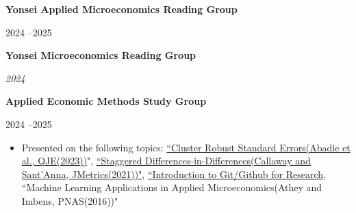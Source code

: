 \documentclass[10pt,letterpaper]{article}
\newenvironment{onecolentry}{}{\par}
\newenvironment{twocolentry}[1]{%
  \par\noindent\def\entrydate{#1}%
  \begin{minipage}[t]{\dimexpr\linewidth-4.05cm-0.15cm\relax}%
    \raggedright
}{%
  \end{minipage}\hfill
  \begin{minipage}[t]{4.05cm}\raggedleft\entrydate\end{minipage}\par
}
\newenvironment{highlights}{\begin{itemize}}{\end{itemize}}
\begin{document}
\vspace{2pt}

\begin{twocolentry}{

	2024 –2025}
	\textbf{Yonsei Applied Microeconomics Reading Group}
\end{twocolentry}

\vspace{2pt}

\begin{twocolentry}{

	\textit{2024 }}
	\textbf{Yonsei Microeconomics Reading Group}
\end{twocolentry}

\vspace{2pt}

\begin{twocolentry}{

	2024 –2025}
	\textbf{Applied Economic Methods Study Group}
\end{twocolentry}

\vspace{1pt}
\begin{onecolentry}
	\begin{highlights}
		\item Presented on the following topics: \href{https://wooyongp.github.io/ref/Cluster_SE.html}{``Cluster Robust Standard Errors(Abadie et al., QJE(2023))}", \href{https://www.dropbox.com/scl/fi/rrg7puid9k5btqk6cp7n4/sdid1_public.pdf?rlkey=pti5il9zfrzz0xkb4snbbfxa5&e=1&dl=0}{``Staggered Differences-in-Differences(Callaway and Sant'Anna, JMetrics(2021))"},
		\href{https://wooyongp.github.io/git-intro/Slides.html\#/title-slide}{``Introduction to Git/Github for Research}, ``Machine Learning Applications in Applied Microeconomics(Athey and Imbens, PNAS(2016))"
	\end{highlights}
\end{onecolentry}
\end{document}
